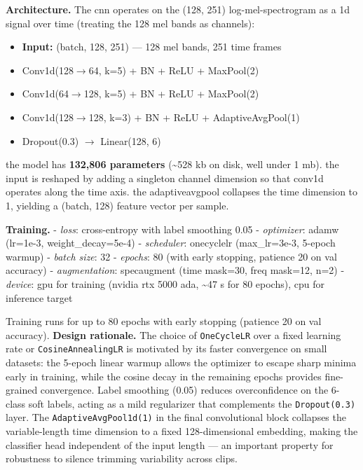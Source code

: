 \documentclass[conference]{IEEEtran}
\providecommand{\tightlist}{%
  \setlength{\itemsep}{0pt}\setlength{\parskip}{0pt}}
\begin{document}
\textbf{Architecture.} The cnn operates on the (128, 251)
log-mel-spectrogram as a 1d signal over time (treating the 128 mel bands
as channels):
{\small
\begin{itemize}
\tightlist
\item \textbf{Input:} (batch, 128, 251) --- 128 mel bands, 251 time frames
\item Conv1d(128$\to$64, k=5) + BN + ReLU + MaxPool(2)
\item Conv1d(64$\to$128, k=5) + BN + ReLU + MaxPool(2)
\item Conv1d(128$\to$128, k=3) + BN + ReLU + AdaptiveAvgPool(1)
\item Dropout(0.3) $\to$ Linear(128, 6)
\end{itemize}

the model has \textbf{132,806 parameters} (\textasciitilde528 kb on
disk, well under 1 mb). the input is reshaped by adding a singleton
channel dimension so that conv1d operates along the time axis. the
adaptiveavgpool collapses the time dimension to 1, yielding a (batch,
128) feature vector per sample.

\textbf{Training.} - \emph{loss}: cross-entropy with label smoothing
0.05 - \emph{optimizer}: adamw (lr=1e-3, weight\_decay=5e-4) -
\emph{scheduler}: onecyclelr (max\_lr=3e-3, 5-epoch warmup) -
\emph{batch size}: 32 - \emph{epochs}: 80 (with early stopping, patience
20 on val accuracy) - \emph{augmentation}: specaugment (time mask=30,
freq mask=12, n=2) - \emph{device}: gpu for training (nvidia rtx 5000
ada, \textasciitilde47 s for 80 epochs), cpu for inference target

Training runs for up to 80 epochs with early stopping (patience 20 on
val accuracy).
\noindent\textbf{Design rationale.} The choice of 
\texttt{OneCycleLR} over a fixed learning rate or 
\texttt{CosineAnnealingLR} is motivated by its faster 
convergence on small datasets: the 5-epoch linear warmup 
allows the optimizer to escape sharp minima early in 
training, while the cosine decay in the remaining epochs 
provides fine-grained convergence. Label smoothing (0.05) 
reduces overconfidence on the 6-class soft labels, acting 
as a mild regularizer that complements the \texttt{Dropout(0.3)} 
layer. The \texttt{AdaptiveAvgPool1d(1)} in the final 
convolutional block collapses the variable-length time 
dimension to a fixed 128-dimensional embedding, making 
the classifier head independent of the input length --- 
an important property for robustness to silence trimming 
variability across clips.


}
\end{document}
